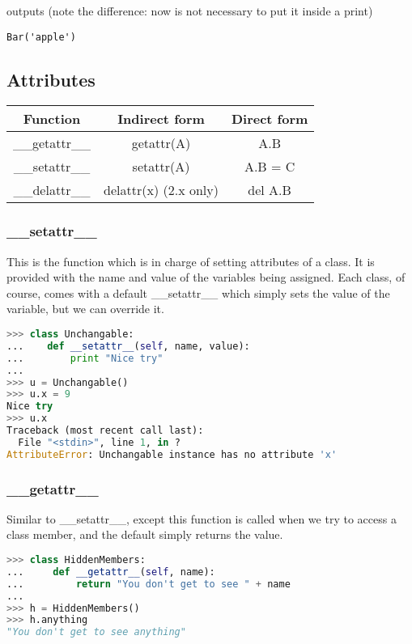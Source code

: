 outputs (note the difference: now is not necessary to put it inside a print)
\scriptsize
\begin{verbatim}
Bar('apple')
\end{verbatim}
\normalsize

\subsection{Attributes}
\begin{tabular}{|c|c|c|}
\hline
Function&Indirect form & Direct form\\
\hline
\_\_getattr\_\_&	getattr(A)& A.B\\
\hline
\_\_setattr\_\_&	setattr(A)& A.B = C\\
\hline
\_\_delattr\_\_&	delattr(x) (2.x only) & del A.B\\
\hline
\end{tabular}

\subsubsection{\_\_setattr\_\_}
This is the function which is in charge of setting attributes of a class. It is
provided with the name and value of the variables being assigned. Each class, of
course, comes with a default \_\_setattr\_\_ which simply sets the value of the
variable, but we can override it.
\lstset{basicstyle=\scriptsize, numbers=left, captionpos=b, tabsize=4}
\begin{lstlisting}[caption=setattr example,language={Python},
xleftmargin=15pt, label=lst:setattrexample]
>>> class Unchangable:
...    def __setattr__(self, name, value):
...        print "Nice try"
...
>>> u = Unchangable()
>>> u.x = 9
Nice try
>>> u.x
Traceback (most recent call last):
  File "<stdin>", line 1, in ?
AttributeError: Unchangable instance has no attribute 'x'
\end{lstlisting}

\subsubsection{\_\_getattr\_\_}
Similar to \_\_setattr\_\_, except this function is called when we try to access
a class member, and the default simply returns the value.
\lstset{basicstyle=\scriptsize, numbers=left, captionpos=b, tabsize=4}
\begin{lstlisting}[caption=getattr example,language={Python},
xleftmargin=15pt, label=lst:getattrexample]
>>> class HiddenMembers:
...     def __getattr__(self, name):
...         return "You don't get to see " + name
...
>>> h = HiddenMembers()
>>> h.anything
"You don't get to see anything"
\end{lstlisting}


